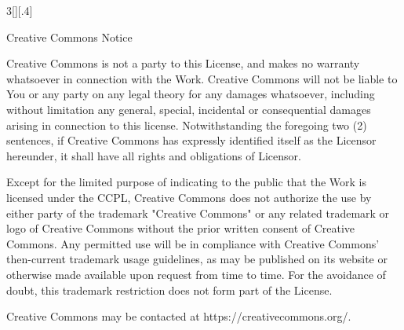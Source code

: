 \documentclass[8pt,a4paper]{article}
\begin{document}
\begin{multicols}{3}[][.4\paperwidth]
\begin{enumerate}
\begin{enumerate}
 \end{enumerate}

\end{enumerate}

   Creative Commons Notice

   \smallskip

   Creative Commons is not a party to this License, and makes no warranty
   whatsoever in connection with the Work. Creative Commons will not be
   liable to You or any party on any legal theory for any damages
   whatsoever, including without limitation any general, special,
   incidental or consequential damages arising in connection to this
   license. Notwithstanding the foregoing two (2) sentences, if Creative
   Commons has expressly identified itself as the Licensor hereunder, it
   shall have all rights and obligations of Licensor.

   \smallskip

   Except for the limited purpose of indicating to the public that the
   Work is licensed under the CCPL, Creative Commons does not authorize
   the use by either party of the trademark "Creative Commons" or any
   related trademark or logo of Creative Commons without the prior
   written consent of Creative Commons. Any permitted use will be in
   compliance with Creative Commons' then-current trademark usage
   guidelines, as may be published on its website or otherwise made
   available upon request from time to time. For the avoidance of doubt,
   this trademark restriction does not form part of the License.

   \smallskip

   Creative Commons may be contacted at https://creativecommons.org/.

\end{multicols}
\end{document}
